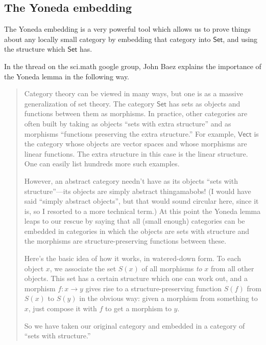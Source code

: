 \documentclass[a4paper]{report}
\theoremstyle{definition}
\theoremstyle{plain}
\theoremstyle{remark}
\begin{document}
\subsection{The Yoneda embedding}
The Yoneda embedding is a very powerful tool which allows us to prove things about any locally small category by embedding that category into $\mathsf{Set}$, and using the structure which $\mathsf{Set}$ has. 

In the thread \cite{baez-categories-usenet} on the sci.math google group, John Baez explains the importance of the Yoneda lemma in the following way.

\begin{quote}
  Category theory can be viewed in many ways, but one is as a massive generalization of set theory.  The category $\mathsf{Set}$ has sets as objects and functions between them as morphisms.  In practice, other categories are often built by taking as objects ``sets with extra structure'' and as morphisms ``functions preserving the extra structure.''  For example, $\mathsf{Vect}$ is the category whose objects are vector spaces and whose morphisms are linear functions.  The extra structure in this case is the linear structure.  One can easily list hundreds more such examples.  

  However, an abstract category needn't have as its objects ``sets with structure''---its objects are simply abstract thingamabobs!  (I would have said ``simply abstract objects'', but that would sound circular here, since it is, so I resorted to a more technical term.)  At this point the Yoneda lemma leaps to our rescue by saying that all (small enough) categories can be embedded in categories in which the objects are sets with structure and the morphisms are structure-preserving functions between these.  

  Here's the basic idea of how it works, in watered-down form.  To each object $x$, we associate the set $S(x)$ of all morphisms \textit{to} $x$ from all other objects.  This set has a certain structure which one can work out, and a morphism $f\colon x \to y$ gives rise to a structure-preserving function $S(f)$ from $S(x)$ to $S(y)$ in the obvious way: given a morphism from something to $x$, just compose it with $f$ to get a morphism to $y$.

  So we have taken our original category and embedded in a category of ``sets with structure.''
\end{quote}
\end{document}
